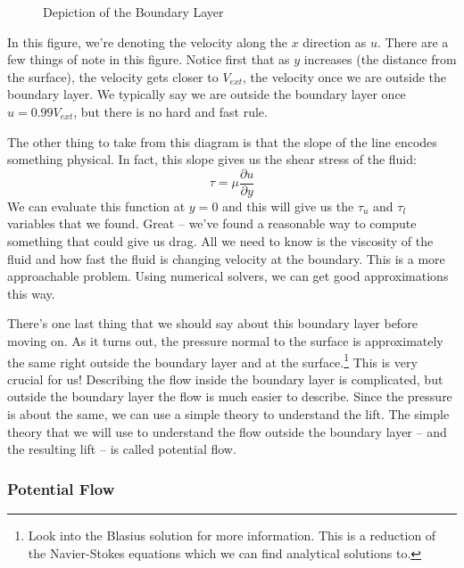 \documentclass[10pt, openany, titlepage]{book}
\theoremstyle{definition}
\begin{document}
\begin{figure}[H]

    \caption{Depiction of the Boundary Layer}
    \label{fig:boundary layer}
\end{figure}
In this figure, we're denoting the velocity along the $x$ direction as $u$. There are a few things of note in this figure. Notice first that as $y$ increases (the distance from the surface), the velocity gets closer to $V_{ext}$, the velocity once we are outside the boundary layer. We typically say we are outside the boundary layer once $u=0.99V_{ext}$, but there is no hard and fast rule. 

The other thing to take from this diagram is that the slope of the line encodes something physical. In fact, this slope gives us the shear stress of the fluid:
$$\tau=\mu\frac{\partial u}{\partial y}$$
We can evaluate this function at $y=0$ and this will give us the $\tau_u$ and $\tau_l$ variables that we found. Great -- we've found a reasonable way to compute something that could give us drag. All we need to know is the viscosity of the fluid and how fast the fluid is changing velocity at the boundary. This is a more approachable problem. Using numerical solvers, we can get good approximations this way.

There's one last thing that we should say about this boundary layer before moving on. As it turns out, the pressure normal to the surface is approximately the same right outside the boundary layer and at the surface.\footnote{Look into the Blasius solution for more information. This is a reduction of the Navier-Stokes equations which we can find analytical solutions to.} This is very crucial for us! Describing the flow inside the boundary layer is complicated, but outside the boundary layer the flow is much easier to describe. Since the pressure is about the same, we can use a simple theory to understand the lift. The simple theory that we will use to understand the flow outside the boundary layer -- and the resulting lift -- is called potential flow.

\subsubsection{Potential Flow}\label{sec:potential flow}
\end{document}
